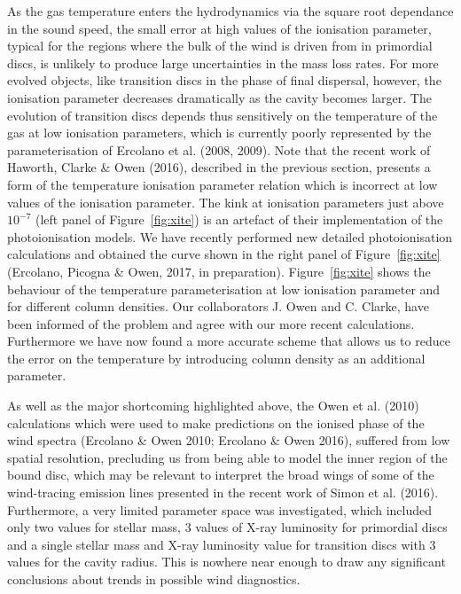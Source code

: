 \documentclass[10pt,fleqn,twoside]{article}
\begin{document}
As the gas temperature enters the hydrodynamics via the square root
dependance in the sound speed, the small error at high values of the
ionisation parameter, typical for the regions where the bulk of the
wind is driven from in primordial discs, is unlikely to produce large
uncertainties in the mass loss rates. For more evolved objects, like
transition discs in the phase of final dispersal, however, the ionisation
parameter decreases dramatically as the cavity becomes larger. The
evolution of transition discs depends thus sensitively on the temperature
of the gas at low ionisation parameters, which is currently poorly
represented by the parameterisation of Ercolano et al. (2008, 2009). 
Note that the recent work of Haworth, Clarke \& Owen (2016), described
in the previous section, presents a
form of the temperature ionisation parameter relation which is incorrect at
low values of the ionisation parameter. The kink at ionisation
parameters just above $10^{-7}$ (left panel of Figure~\ref{fig:xite}) is an artefact of their implementation
of the photoionisation models. We have recently performed new detailed
photoionisation calculations and obtained the curve shown in the right
panel of Figure~\ref{fig:xite} (Ercolano, Picogna \& Owen, 2017, in preparation).
Figure~\ref{fig:xite} shows the behaviour of the temperature parameterisation at
low ionisation parameter and for different column densities.  Our
collaborators J. Owen and C. Clarke, have been informed of the problem
and agree with our more recent calculations. Furthermore we have now
found a more accurate scheme that allows us to reduce the error on the
temperature by introducing  column density as an additional
parameter. 

As well as the major shortcoming highlighted above, the Owen et
al. (2010) calculations which were used to make predictions on
the ionised phase of the wind spectra (Ercolano \& Owen 2010;
Ercolano \& Owen 2016), suffered from low spatial resolution,
precluding us from being able to model the inner region of the bound disc, which
may be relevant to interpret the broad wings of some of the
wind-tracing emission lines presented in the recent
work of Simon et al. (2016). Furthermore, a very limited
parameter space was investigated, which included only two values for
stellar mass, 3 values of X-ray luminosity for primordial discs and a
single stellar mass and X-ray luminosity value for transition discs
with 3 values for the cavity radius. This is nowhere near enough to draw any
significant conclusions about trends in possible wind diagnostics. 
\end{document}
